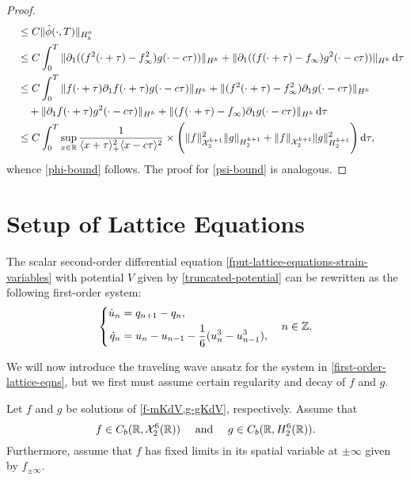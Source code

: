 \begin{proof}
\begin{align*}
		&\quad\leq C \| \hat\phi(\cdot, T) \|_{H^0_k} \\
		&\quad\leq C \int_0^T \| \partial_1 ((f^2(\cdot+\tau)-f_\infty^2)g(\cdot-c\tau)) \|_{H^k} + \| \partial_1( (f(\cdot+\tau)-f_\infty)g^2(\cdot-c\tau)) \|_{H^k} \, \mathrm d \tau \\
		&\quad\leq C \int_0^T \| f(\cdot+\tau)\partial_1 f(\cdot + \tau)g(\cdot-c\tau) \|_{H^k} + \|(f^2(\cdot+\tau) -f_\infty^2) \partial_1 g(\cdot - c\tau) \|_{H^k}  \\
		&\qquad + \|\partial_1f(\cdot+\tau) g^2(\cdot - c\tau) \|_{H^k} + \| (f(\cdot + \tau) -f_\infty) \partial_1 g(\cdot - c\tau) \|_{H^k}\, \mathrm{d}\tau \\ 
		&\quad\leq C \int_0^T \sup_{x\in\mathbb{R}} \frac 1 {\langle x + \tau\rangle_+^2 \langle x - c\tau\rangle^2} \times \Bigg( \|f\|^2_{\mathcal X^{k+1}_{2}} \| g \|_{H^{k+1}_2} + \|f\|_{\mathcal X^{k+1}_{2}} \| g \|^2_{H^{k+1}_2} \Bigg) \, \mathrm d \tau, 
	\end{align*} 
	whence \cref{phi-bound} follows. The proof for \cref{psi-bound} is analogous.
\end{proof}

\section{Setup of Lattice Equations}

The scalar second-order differential equation \cref{fput-lattice-equations-strain-variables} with potential \(V\) given by \cref{truncated-potential} can be rewritten as the following first-order system:
\begin{equation}\label{first-order-lattice-eqns}
	\left\{\begin{aligned}\dot u _n &= q_{n+1} - q_n, \\
	\dot q_n &= u_n - u_{n-1} - \frac{1} 6 ( u_n^3 - u^3_{n-1}),\end{aligned} \right. \quad n \in \mathbb{Z}.
\end{equation}

We will now introduce the traveling wave ansatz for the system in \cref{first-order-lattice-eqns}, but we first must assume certain regularity and decay of \(f\) and \(g\).
\begin{assum}\label{assumption-1}
	Let \(f\) and \(g\) be solutions of \cref{f-mKdV,g-gKdV}, respectively. Assume that \[f\in C_b(\mathbb{R}, \mathcal{X}_2^6(\mathbb{R})) \quad \text{ and } \quad g\in C_b(\mathbb{R},H_2^6(\mathbb{R})).\] Furthermore, assume that \(f\) has fixed limits in its spatial variable at \(\pm \infty\) given by \(f_{\pm \infty}\).
\end{assum}

